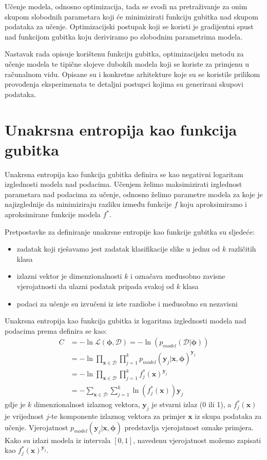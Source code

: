 \documentclass[times, utf8, diplomski, numeric]{fer}
\begin{document}
Učenje modela, odnosno optimizacija, tada se svodi na pretraživanje za onim skupom slobodnih parametara koji će minimizirati funkciju gubitka nad skupom podataka za učenje.
Optimizacijski postupak koji se koristi je gradijentni spust nad funkcijom gubitka koju deriviramo po slobodnim parametrima modela.

Nastavak rada opisuje korištenu funkciju gubitka, optimizacijsku metodu za učenje modela te tipične slojeve dubokih modela koji se koriste za primjenu u računalnom vidu.
Opisane su i konkretne arhitekture koje su se koristile prilikom provođenja eksperimenata te detaljni postupci kojima su generirani skupovi podataka.

\section{Unakrsna entropija kao funkcija gubitka}
Unakrsna entropija kao funkcija gubitka definira se kao negativni logaritam izglednosti modela nad podacima. Učenjem želimo maksimizirati izglednost parametara nad podacima za učenje, odnosno želimo parametre modela za koje je najizglednije da minimiziraju razliku između funkcije $f$ koju aproksimiramo i aproksimirane funkcije modela $f^*$.

Pretpostavke za definiranje unakrsne entropije kao funkcije gubitka su sljedeće:
\begin{itemize}
 \item zadatak koji rješavamo jest zadatak klasifikacije slike u jednu od $k$ različitih klasa
 \item izlazni vektor je dimenzionalnosti $k$ i označava međusobno zavisne vjerojatnosti da ulazni podatak pripada svakoj od $k$ klasa
 \item podaci za učenje su izvučeni iz iste razdiobe i međusobno su nezavisni
\end{itemize}

\noindent Unakrsna entropija kao funkcija gubitka iz logaritma izglednosti modela nad podacima prema \citep{book:machine_learning} definira se kao:
\begin{align}
 C &= - \ln \mathcal{L}(\boldsymbol{\phi}, \mathcal{D}) = - \ln (p_{model}(\mathcal{D} | \boldsymbol{\phi})) \nonumber \\
 &= - \ln \prod_{\mathbf{x} \in \mathcal{D}} \prod_{j=1}^{k} p_{model}(\mathbf{y}_j | \mathbf{x}, \boldsymbol{\phi})^{\mathbf{y}_j} \nonumber \\
 &= - \ln \prod_{\mathbf{x} \in \mathcal{D}} \prod_{j=1}^{k} f_j^*(\mathbf{x})^{\mathbf{y}_j} \nonumber \\
 &= - \sum_{\mathbf{x} \in \mathcal{D}} \sum_{j=1}^{k} \ln (f_j^*(\mathbf{x})) \mathbf{y}_j \label{eq:neg_log_likelihood}
\end{align}
gdje je $k$ dimenzionalnost izlaznog vektora, $\mathbf{y}_j$ je stvarni izlaz (0 ili 1), a $f_j^*(\mathbf{x})$ je vrijednost $j$-te komponente izlaznog vektora za primjer $\mathbf{x}$ iz skupa podataka za učenje.
Vjerojatnost $p_{model}(\mathbf{y}_j | \mathbf{x}, \boldsymbol{\phi})$ predstavlja vjerojatnost oznake primjera. Kako su izlazi modela iz intervala $\left[ 0, 1\right]$,
navedenu vjerojatnost možemo zapisati kao $f_j^*(\mathbf{x})^{\mathbf{y}_j}$.
\end{document}
